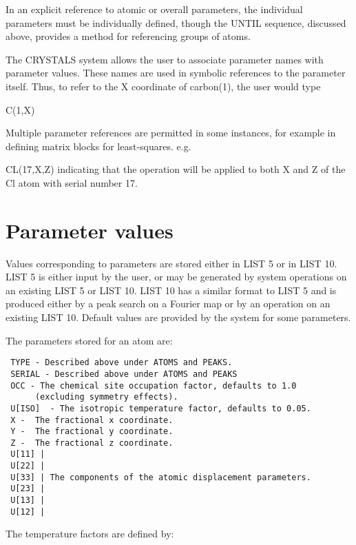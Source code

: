 \documentclass[10pt,a4paper]{report}
\begin{document}
In an explicit reference to atomic or overall parameters,
 the individual parameters must be individually defined, though the UNTIL
 sequence, discussed above, provides a method for referencing groups of atoms.


The CRYSTALS system allows the user to associate  parameter names 
 with parameter values. These names are used in symbolic references to the
 parameter itself. 
 Thus, to refer to the X coordinate of carbon(1), the user would type


C(1,X)


Multiple parameter references are permitted in some instances, for example in
 defining matrix blocks for least-squares. e.g.


CL(17,X,Z) indicating that the operation will be applied to both X and Z of the Cl atom with serial number 17.



\section{Parameter values}





Values corresponding to parameters are stored 
 either in LIST 5 or in LIST 10. LIST 5
 is either input by the user, or may be generated by system operations
 on an existing LIST 5 or LIST 10. LIST 10 has a similar format to LIST 5
 and is produced either by a peak search on a Fourier map or by an operation on
 an existing LIST 10. Default values are provided by the system for some 
 parameters.





The parameters stored for an atom are:




\small\begin{verbatim}
 TYPE - Described above under ATOMS and PEAKS.
 SERIAL - Described above under ATOMS and PEAKS
 OCC - The chemical site occupation factor, defaults to 1.0 
      (excluding symmetry effects).
 U[ISO]  - The isotropic temperature factor, defaults to 0.05.
 X -  The fractional x coordinate.
 Y -  The fractional y coordinate.
 Z -  The fractional z coordinate.
 U[11] | 
 U[22] |
 U[33] | The components of the atomic displacement parameters.
 U[23] |
 U[13] |
 U[12] |
\end{verbatim}\normalsize




The temperature factors are defined by:
\end{document}
